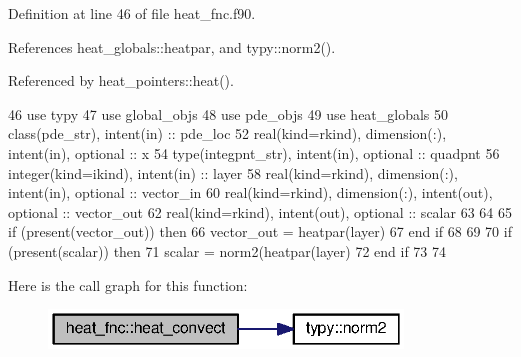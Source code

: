 Definition at line 46 of file heat\+\_\+fnc.\+f90.



References heat\+\_\+globals\+::heatpar, and typy\+::norm2().



Referenced by heat\+\_\+pointers\+::heat().


\begin{DoxyCode}
46       \textcolor{keywordtype}{use }typy
47       \textcolor{keywordtype}{use }global_objs
48       \textcolor{keywordtype}{use }pde_objs
49       \textcolor{keywordtype}{use }heat_globals
50       \textcolor{keywordtype}{class}(pde_str), \textcolor{keywordtype}{intent(in)} :: pde\_loc
52       \textcolor{keywordtype}{real(kind=rkind)}, \textcolor{keywordtype}{dimension(:)}, \textcolor{keywordtype}{intent(in)}, \textcolor{keywordtype}{optional}    :: x
54       \textcolor{keywordtype}{type}(integpnt_str), \textcolor{keywordtype}{intent(in)}, \textcolor{keywordtype}{optional} :: quadpnt
56       \textcolor{keywordtype}{integer(kind=ikind)}, \textcolor{keywordtype}{intent(in)} :: layer
58       \textcolor{keywordtype}{real(kind=rkind)}, \textcolor{keywordtype}{dimension(:)}, \textcolor{keywordtype}{intent(in)}, \textcolor{keywordtype}{optional}  :: vector\_in
60       \textcolor{keywordtype}{real(kind=rkind)}, \textcolor{keywordtype}{dimension(:)}, \textcolor{keywordtype}{intent(out)}, \textcolor{keywordtype}{optional} :: vector\_out
62       \textcolor{keywordtype}{real(kind=rkind)}, \textcolor{keywordtype}{intent(out)}, \textcolor{keywordtype}{optional}               :: scalar
63       
64       
65         \textcolor{keywordflow}{if} (\textcolor{keyword}{present}(vector\_out)) \textcolor{keywordflow}{then}
66           vector\_out = heatpar(layer)%
67 \textcolor{keywordflow}{        end if}
68         
69         
70         \textcolor{keywordflow}{if} (\textcolor{keyword}{present}(scalar)) \textcolor{keywordflow}{then}
71           scalar = norm2(heatpar(layer)%
72 \textcolor{keywordflow}{        end if}
73    
74       
\end{DoxyCode}


Here is the call graph for this function\+:\nopagebreak
\begin{figure}[H]
\begin{center}
\leavevmode
\includegraphics[width=267pt]{namespaceheat__fnc_a78d9b0142d4b3c80c78e16137bd531c7_cgraph}
\end{center}
\end{figure}





